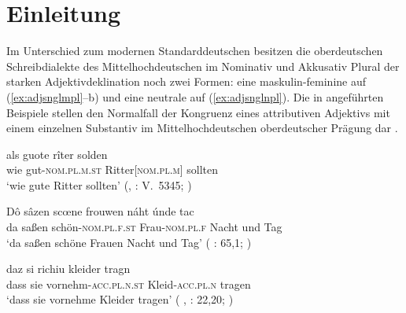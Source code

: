\chapter{Einleitung}
\label{ch:einleitung}

Im Unterschied zum modernen Standarddeutschen besitzen die oberdeutschen
Schreib\-dialekte des Mittelhochdeutschen im Nominativ
und Akkusativ Plural der starken Adjektivdeklination noch zwei Formen: eine
maskulin-feminine auf  (\ref{ex:adjsnglmpl}--b) und eine neutrale auf
 (\ref{ex:adjsnglnpl}). Die in  angeführten
Beispiele stellen den Normalfall der Kongruenz eines attributiven Adjektivs mit
einem einzelnen Substantiv im Mittelhochdeutschen
oberdeutscher Prägung dar
\autocites[vgl.][181--184]{ksw2}[200--203]{paul2007}.

\begin{exe}
\ex \label{ex:adjsngl}
	\begin{xlist}
	\ex \label{ex:adjsnglmpl}
		\gll als guote rîter solden \\
			wie gut-\textsc{nom.pl.m.st} Ritter[\textsc{nom.pl.m}] sollten \\
	\trans `wie gute Ritter sollten'
		(, : V.~5345;
			\cite[606]{mertens2004}%
		)

	\ex \label{ex:adjsnglfpl}
		\gll Dô sâzen scœne frouwen náht únde tac \\
			da saßen schön-\textsc{nom.pl.f.st} Frau-\textsc{nom.pl.f} Nacht 
			und	Tag \\
	\trans `da saßen schöne Frauen Nacht und Tag'
		(%
			: 65,1;
			\cite[16]{deboor1988}%
		)

	\ex \label{ex:adjsnglnpl}
		\gll daz si richiu kleider tragn \\
			dass sie vornehm-\textsc{acc.pl.n.st} Kleid-\textsc{acc.pl.n}
			tragen \\
		\trans `dass sie vornehme Kleider tragen'
			(%
				, : 22,20;
				\cite[24]{knechtschirok2003}%
			)
\end{xlist}
\end{exe}

